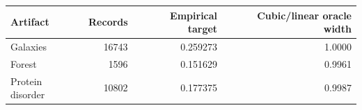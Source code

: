 \small
\begin{tabular}{lrrr}
\toprule
Artifact & Records & Empirical target & Cubic/linear oracle width \\
\midrule
Galaxies & 16743 & 0.259273 & 1.0000 \\
Forest & 1596 & 0.151629 & 0.9961 \\
Protein disorder & 10802 & 0.177375 & 0.9987 \\
\bottomrule
\end{tabular}
